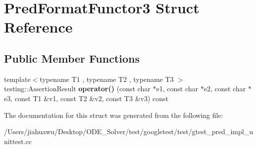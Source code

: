 \hypertarget{struct_pred_format_functor3}{}\section{Pred\+Format\+Functor3 Struct Reference}
\label{struct_pred_format_functor3}
\subsection*{Public Member Functions}
\begin{DoxyCompactItemize}
\item 
\mbox{\label{struct_pred_format_functor3_a35575b0ed1e572d3a31603b07a3f6b30}} 
{\footnotesize template$<$typename T1 , typename T2 , typename T3 $>$ }\\testing\+::\+Assertion\+Result {\bfseries operator()} (const char $\ast$e1, const char $\ast$e2, const char $\ast$e3, const T1 \&v1, const T2 \&v2, const T3 \&v3) const
\end{DoxyCompactItemize}


The documentation for this struct was generated from the following file\+:\begin{DoxyCompactItemize}
\item 
/\+Users/jiahuawu/\+Desktop/\+O\+D\+E\+\_\+\+Solver/test/googletest/test/gtest\+\_\+pred\+\_\+impl\+\_\+unittest.\+cc\end{DoxyCompactItemize}
